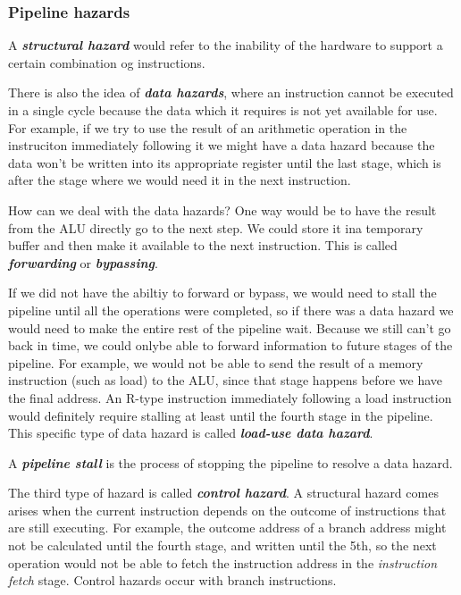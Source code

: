 \documentclass{article}
\begin{document}
\subsubsection{Pipeline hazards}
A \textit{\textbf{structural hazard}} would refer to the inability of the hardware to support a certain
combination og instructions.

There is also the idea of \textit{\textbf{data hazards}}, where an instruction cannot be executed in a 
single cycle because the data which it requires is not yet available for use. For example, if we try to 
use the result of an arithmetic operation in the instruciton immediately following it we might have a 
data hazard because the data won't be written into its appropriate register until the last stage, which
is after the stage where we would need it in the next instruction.

How can we deal with the data hazards? One way would be to have the result from the ALU directly go to the next
step. We could store it ina temporary buffer and then make it available to the next instruction. This is called
\textit{\textbf{forwarding}} or \textit{\textbf{bypassing}}.

If we did not have the abiltiy to forward or bypass, we would need to stall the pipeline until all the operations
were completed, so if there was a data hazard we would need to make the entire rest of the pipeline wait. Because
we still can't go back in time, we could onlybe able to forward information to future stages of the pipeline. For
example, we would not be able to send the result of a memory instruction (such as load) to the ALU, since that 
stage happens before we have the final address. An R-type instruction immediately following a load instruction
would definitely require stalling at least until the fourth stage in the pipeline. This specific type of 
data hazard is called \textit{\textbf{load-use data hazard}}.

A \textit{\textbf{pipeline stall}} is the process of stopping the pipeline to resolve a data hazard.

The third type of hazard is called \textit{\textbf{control hazard}}. A structural hazard comes arises
when the  current instruction depends on the outcome of instructions that are still executing. For
example, the outcome address of a branch address might not be calculated until the fourth stage, and 
written until the 5th, so the next operation would not be able to fetch the instruction address
in the \textit{instruction fetch} stage. Control hazards occur with branch instructions.
\end{document}
